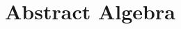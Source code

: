 \chapter{Abstract Algebra }
\lipsum[1]

\lipsum[0]

\lipsum[1]

\lipsum[1]

\lipsum[1]

\lipsum[1]

\lipsum[1]

\lipsum[1]

\lipsum[1]

\lipsum[1]

\lipsum[1]

\lipsum[1]

\lipsum[0]

\lipsum[1]

\lipsum[1]

\lipsum[1]

\lipsum[1]

\lipsum[1]

\lipsum[1]

\lipsum[1]

\lipsum[1]

\lipsum[1]

\lipsum[1]

\lipsum[0]

\lipsum[1]

\lipsum[1]

\lipsum[1]

\lipsum[1]

\lipsum[1]

\lipsum[1]

\lipsum[1]

\lipsum[1]

\lipsum[1]

\lipsum[1]